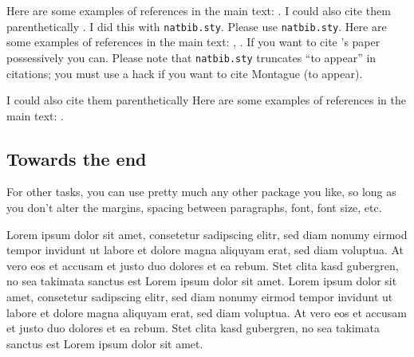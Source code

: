 \documentclass[a4paper,12pt,twoside]{article}
\begin{document}
Here are some examples of references in the main text: \citet{Montague73, HeimKratzer98}.  I could also cite them parenthetically \citep{Montague73, HeimKratzer98}.  I did this with \texttt{natbib.sty}.  Please use \texttt{natbib.sty}. Here are some examples of references in the main text: \citet{Dowty78}, \citet{HeimKratzer98}.  If you want to cite \citeauthor{kz84}'s \citeyearpar{kz84} paper possessively you can. Please note that \texttt{natbib.sty} truncates ``to appear'' \citep[as in][]{Montague73a} in citations; you must use a hack if you want to cite \nocite{Montague73a} Montague (to appear). 

I could also cite them parenthetically Here are some examples of references in the main text: \citet{Montague73, HeimKratzer98}. 







\newpage
\subsection{Towards the end}

For other tasks, you can use pretty much any other package you like, so long as you don't alter the margins, spacing between paragraphs, font, font size, etc.


\newpage

Lorem ipsum dolor sit amet, consetetur sadipscing elitr, sed diam nonumy eirmod tempor invidunt ut labore et dolore magna aliquyam erat, sed diam voluptua. At vero eos et accusam et justo duo dolores et ea rebum. Stet clita kasd gubergren, no sea takimata sanctus est Lorem ipsum dolor sit amet. Lorem ipsum dolor sit amet, consetetur sadipscing elitr, sed diam nonumy eirmod tempor invidunt ut labore et dolore magna aliquyam erat, sed diam voluptua. At vero eos et accusam et justo duo dolores et ea rebum. Stet clita kasd gubergren, no sea takimata sanctus est Lorem ipsum dolor sit amet.
\end{document}
